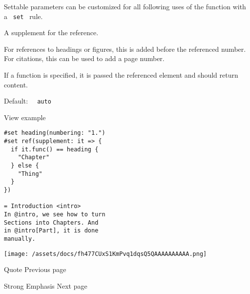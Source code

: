 \label{parameters-supplement-settable-tooltip}
Settable parameters can be customized for all following uses of the
function with a \texttt{\ set\ } rule.

A supplement for the reference.

For references to headings or figures, this is added before the
referenced number. For citations, this can be used to add a page number.

If a function is specified, it is passed the referenced element and
should return content.

Default: \texttt{\ }{\texttt{\ auto\ }}\texttt{\ }


View example

\begin{verbatim}
#set heading(numbering: "1.")
#set ref(supplement: it => {
  if it.func() == heading {
    "Chapter"
  } else {
    "Thing"
  }
})

= Introduction <intro>
In @intro, we see how to turn
Sections into Chapters. And
in @intro[Part], it is done
manually.
\end{verbatim}

\texttt{[image: /assets/docs/fh477CUxS1KmPvq1dqsQ5QAAAAAAAAAA.png]}

\href{/docs/reference/model/quote/}{\pandocbounded{}}

{ Quote } { Previous page }

\href{/docs/reference/model/strong/}{\pandocbounded{}}

{ Strong Emphasis } { Next page }
